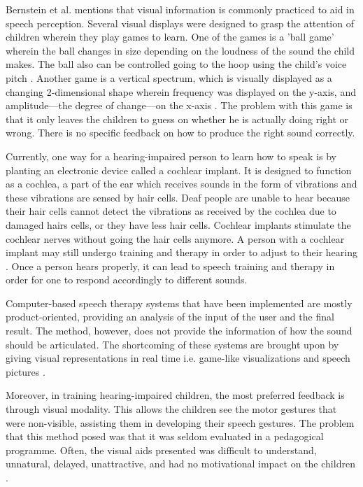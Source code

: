 Bernstein et al. \citeyear{bernstein:1988:STA} mentions that visual information is commonly practiced to aid in speech perception. Several visual displays were designed to grasp the attention of children wherein they play games to learn. One of the games is a ’ball game’ wherein the ball changes in size depending on the loudness of the sound the child makes. The ball also can be controlled going to the hoop using the child’s voice pitch \cite{bernstein:1988:STA}. Another game is a vertical spectrum, which is visually displayed as a changing 2-dimensional shape wherein frequency was displayed on the y-axis, and amplitude---the degree of change---on the x-axis \cite{bernstein:1988:STA}. The problem with this game is that it only leaves the children to guess on whether he is actually doing right or wrong. There is no specific feedback on how to produce the right sound correctly.

Currently, one way for a hearing-impaired person to learn how to speak is by planting an electronic device called a cochlear implant. It is designed to function as a cochlea, a part of the ear which receives sounds in the form of vibrations and these vibrations are sensed by hair cells. Deaf people are unable to hear because their hair cells cannot detect the vibrations as received by the cochlea due to damaged hairs cells, or they have less hair cells. Cochlear implants stimulate the cochlear nerves without going the hair cells anymore. A person with a cochlear implant may still undergo training and therapy in order to adjust to their hearing \cite{blume:2009:AE}. Once a person hears properly, it can lead to speech training and therapy in order for one to respond accordingly to different sounds.
					
Computer-based speech therapy systems that have been implemented are mostly product-oriented, providing an analysis of the input of the user and the final result. The method, however, does not provide the information of how the sound should be articulated. The shortcoming of these systems are brought upon by giving visual representations in real time i.e. game-like visualizations and speech pictures \cite{oster:2006:cbs}.
									
Moreover, in training hearing-impaired children, the most preferred feedback is through visual modality. This allows the children see the motor gestures that were non-visible, assisting them in developing their speech gestures. The problem that this method posed was that it was seldom evaluated in a pedagogical programme. Often, the visual aids presented was difficult to understand, unnatural, delayed, unattractive, and had no motivational impact on the children \cite{oster:2006:cbs}.
				
